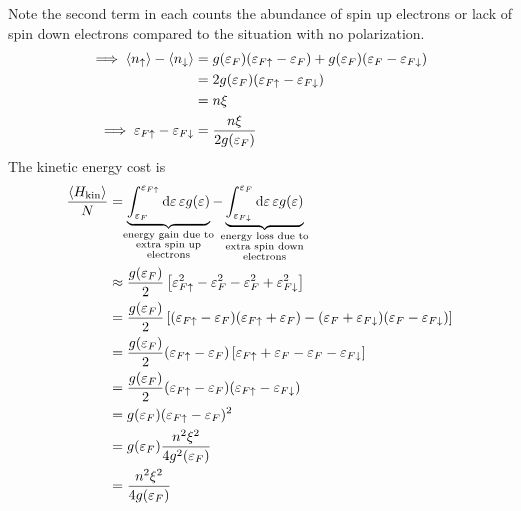 \documentclass[12pt,a4paper,titlepage]{article}
\newcommand{\trm}[1]{\textrm{#1}} %
\newcommand{\up}{\uparrow} %
\newcommand{\dn}{\downarrow} %
\begin{document}
Note the second term in each counts the abundance of spin up electrons or lack of spin down electrons compared to the situation with no polarization.
\begin{equation}
\begin{aligned}
\implies\expval{n_{\up}}-\expval{n_{\dn}}&=g(\varepsilon_{F})(\varepsilon_{F\up}-\varepsilon_{F})+g(\varepsilon_{F})(\varepsilon_{F}-\varepsilon_{F\dn})\\
&=2g(\varepsilon_{F})(\varepsilon_{F\up}-\varepsilon_{F\dn})\\
&=n\xi\\
\implies\varepsilon_{F\up}-\varepsilon_{F\dn}&=\frac{n\xi}{2g(\varepsilon_{F})}
\end{aligned}
\end{equation}
The kinetic energy cost is
\begin{equation}
\begin{aligned}
\frac{\expval{H_{\trm{kin}}}}{N}&=\underbrace{\int_{\varepsilon_{F}}^{\varepsilon_{F\up}}\dd{\varepsilon}\varepsilon g(\varepsilon)}_{\mathclap{\substack{\trm{energy gain due to}\\\trm{extra spin up}\\\trm{electrons}}}}-\underbrace{\int_{\varepsilon_{F\dn}}^{\varepsilon_{F}}\dd{\varepsilon}\varepsilon g(\varepsilon)}_{\mathclap{\substack{\trm{energy loss due to}\\\trm{extra spin down}\\\trm{electrons}}}}\\
&\approx \frac{g(\varepsilon_{F})}{2}\left[\varepsilon_{F\up}^{2}-\varepsilon_{F}^{2}-\varepsilon_{F}^{2}+\varepsilon_{F\dn}^{2}\right]\\
&=\frac{g(\varepsilon_{F})}{2}\left[(\varepsilon_{F\up}-\varepsilon_{F})(\varepsilon_{F\up}+\varepsilon_{F})-(\varepsilon_{F}+\varepsilon_{F\dn})(\varepsilon_{F}-\varepsilon_{F\dn})\right]\\
&=\frac{g(\varepsilon_{F})}{2}(\varepsilon_{F\up}-\varepsilon_{F})\left[\varepsilon_{F\up}+\varepsilon_{F}-\varepsilon_{F}-\varepsilon_{F\dn}\right]\\
&=\frac{g(\varepsilon_{F})}{2}(\varepsilon_{F\up}-\varepsilon_{F})(\varepsilon_{F\up}-\varepsilon_{F\dn})\\
&=g(\varepsilon_{F})(\varepsilon_{F\up}-\varepsilon_{F})^{2}\\
&=g(\varepsilon_{F})\frac{n^{2}\xi^{2}}{4g^{2}(\varepsilon_{F})}\\
&=\frac{n^{2}\xi^{2}}{4g(\varepsilon_{F})}
\end{aligned}
\end{equation}
\end{document}
